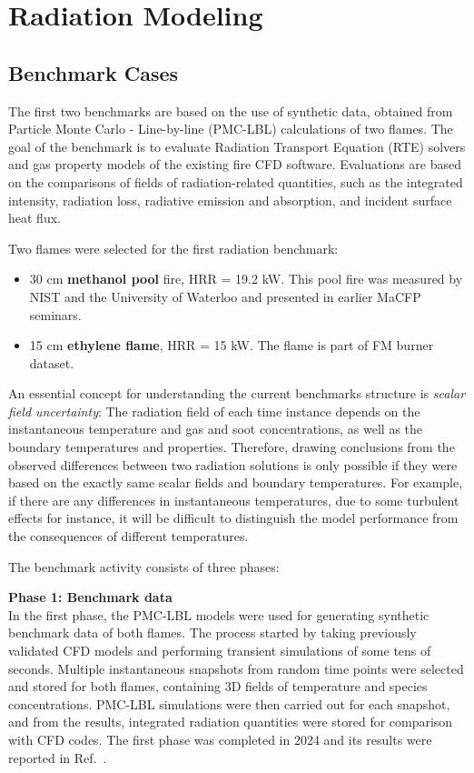 \documentclass[12pt]{article}
\begin{document}
\clearpage
\section{Radiation Modeling}
\label{sec:Radiation}
\subsection{Benchmark Cases}
The first two benchmarks are based on the use of synthetic data, obtained from Particle Monte Carlo - Line-by-line (PMC-LBL) calculations of two flames. The goal of the benchmark is to evaluate Radiation Transport Equation (RTE) solvers and gas property models of the existing fire CFD software. Evaluations are based on the comparisons of fields of radiation-related quantities, such as the integrated intensity, radiation loss, radiative emission and absorption, and incident surface heat flux. 

Two flames were selected for the first radiation benchmark:
\begin{itemize}
    \item{30 cm {\bf methanol pool} fire, HRR = 19.2 kW.} This pool fire was measured by NIST and the University of Waterloo and presented in earlier MaCFP seminars.   
    \item{15 cm {\bf ethylene flame}, HRR = 15 kW.} The flame is part of FM burner dataset. 
\end{itemize}

An essential concept for understanding the current benchmarks structure is \textit{scalar field uncertainty}: The radiation field of each time instance depends on the instantaneous temperature and gas and soot concentrations, as well as the boundary temperatures and properties. Therefore, drawing conclusions from the observed differences between two radiation solutions is only possible if they were based on the exactly same scalar fields and boundary temperatures. For example, if there are any differences in instantaneous temperatures, due to some turbulent effects for instance, it will be difficult to distinguish the model performance from the consequences of different temperatures.  

The benchmark activity consists of three phases: 

\noindent \textbf{Phase 1: Benchmark data}\\
In the first phase, the PMC-LBL models were used for generating synthetic benchmark data of both flames. The process started by taking previously validated CFD models and performing transient simulations of some tens of seconds. Multiple instantaneous snapshots from random time points were selected and stored for both flames, containing 3D fields of temperature and species concentrations. PMC-LBL simulations were then carried out for each snapshot, and from the results, integrated radiation quantities were stored for comparison with CFD codes. The first phase was completed in 2024 and its results were reported in Ref.~\cite{Paul_etal_JQSRT:2024}.
\end{document}
